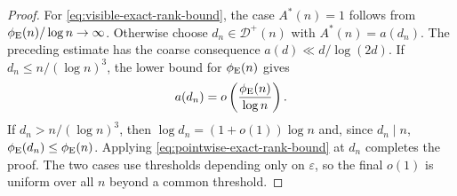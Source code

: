 \begin{proof}
For \eqref{eq:visible-exact-rank-bound}, the case $A^*(n)=1$ follows from
$\phi_{\rm E}(n)/\log n\to\infty$. Otherwise choose
$d_n\in\mathcal D^+(n)$ with $A^*(n)=a(d_n)$. The preceding estimate has
the coarse consequence $a(d)\ll d/\log(2d)$. If
$d_n\leq n/(\log n)^3$, the lower bound for $\phi_{\rm E}(n)$ gives
\[
 a(d_n)=o\left(\frac{\phi_{\rm E}(n)}{\log n}\right).
\]
If $d_n>n/(\log n)^3$, then
$\log d_n=(1+o(1))\log n$ and, since $d_n\mid n$,
$\phi_{\rm E}(d_n)\leq\phi_{\rm E}(n)$. Applying
\eqref{eq:pointwise-exact-rank-bound} at $d_n$ completes the proof. The two
cases use thresholds depending only on $\varepsilon$, so the final $o(1)$ is
uniform over all $n$ beyond a common threshold.
\end{proof}

